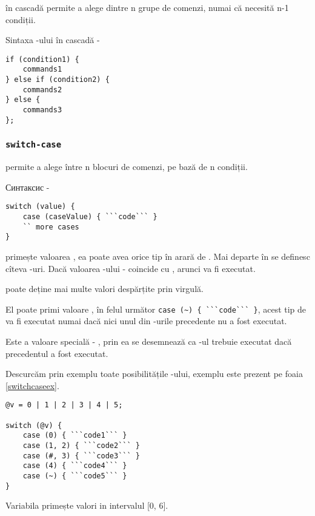  în cascadă permite a alege dintre n grupe de comenzi, numai că necesită n-1 condiții.

Sintaxa -ului în cascadă -
\begin{lstlisting}[numbers=none]
if (condition1) {
	commands1
} else if (condition2) {
	commands2
} else {
	commands3
};
\end{lstlisting}

\subsubsection{\lstinline|switch-case|}

 permite a alege între n blocuri de comenzi, pe bază de n condiții.

Синтаксис -
\begin{lstlisting}[numbers=none]
switch (value) {
	case (caseValue) { ```code``` }
	`` more cases
}
\end{lstlisting}

 primește valoarea , ea poate avea orice tip în arară de \bool. Mai departe în  se definesc cîteva -uri. Dacă valoarea -ului -  coincide cu , arunci  va fi executat.

 poate deține mai multe valori despărțite prin virgulă.

El poate primi valoare \void, în felul următor \lstinline|case (~) { ```code``` }|, acest tip de  va fi executat numai dacă nici unul din -urile precedente nu a fost executat.

Este a valoare specială - \code{#}, prin ea se desemnează ca -ul trebuie executat dacă precedentul a fost executat.

Descurcăm prin exemplu toate posibilitățile -ului, exemplu este prezent pe foaia \ref{switchcaseex}.

\begin{lstlisting}[caption=Folosirea switch-case-ului, label=switchcaseex]
@v = 0 | 1 | 2 | 3 | 4 | 5;

switch (@v) {
	case (0) { ```code1``` }
	case (1, 2) { ```code2``` }
	case (#, 3) { ```code3``` }
	case (4) { ```code4``` }
	case (~) { ```code5``` }
}
\end{lstlisting}

Variabila  primește valori in intervalul [0, 6].

